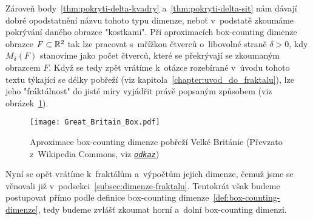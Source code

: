 Zároveň body~\ref{thm:pokryti-delta-kvadry} a~\ref{thm:pokryti-delta-sit} nám dávají dobré opodstatnění názvu tohoto typu dimenze, neboť v~podstatě zkoumáme pokrývání daného obrazce "kostkami". Při aproximacích box-counting dimenze obrazce $F\subset\mathbb{R}^2$ tak lze pracovat s~mřížkou čtverců o~libovolné straně $\delta>0$, kdy $M_\delta(F)$ stanovíme jako počet čtverců, které se překrývají se zkoumaným obrazcem $F$. Když se tedy zpět vrátíme k~otázce rozebírané v~úvodu tohoto textu týkající se délky pobřeží (viz kapitola~\ref{chapter:uvod_do_fraktalu}), lze jeho "fráktálnost" do jisté míry vyjádřit právě popsaným způsobem (viz obrázek~\ref{fig:aproximace-delky-pobrezi-vb}).
\begin{figure}
    \centering
    \texttt{[image: Great\_Britain\_Box.pdf]}
    \caption[Aproximace box-counting dimenze pobřeží Velké Británie]{Aproximace box-counting dimenze pobřeží Velké Británie (Převzato z~Wikipedia Commons, viz \href{https://en.wikipedia.org/wiki/Minkowski\%E2\%80\%93Bouligand\_dimension}{\texttt{\textit{odkaz}}})}
    \label{fig:aproximace-delky-pobrezi-vb}
\end{figure}
Nyní se opět vrátíme k~fraktálům a~výpočtům jejich dimenze, čemuž jsme se věnovali již v~podsekci~\ref{subsec:dimenze-fraktalu}. Tentokrát však budeme postupovat přímo podle definice box-counting dimenze~\ref{def:box-counting-dimenze}, tedy budeme zvlášť zkoumat horní a~dolní box-counting dimenzi.
